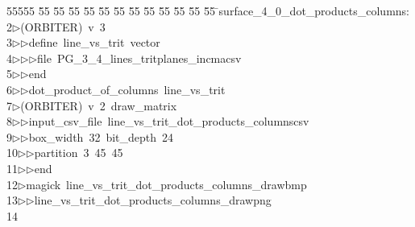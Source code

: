 %
%
\begin{tabbing}
55555 \= 55 \= 55 \= 55 \= 55 \= 55 \= 55 \= 55 \= 55 \= 55 \= 55 \= 55 \= 55 \= \>surface\_4\_0\_dot\_products\_columns:\\[0pt]
2\>$\triangleright$\>(ORBITER)\ v\ 3\ \\[0pt]
3\>$\triangleright$\>$\triangleright$\>define\ line\_vs\_trit\ vector\ \\[0pt]
4\>$\triangleright$\>$\triangleright$\>$\triangleright$\>file\ PG\_3\_4\_lines\_tritplanes\_incmacsv\ \\[0pt]
5\>$\triangleright$\>$\triangleright$\>end\ \\[0pt]
6\>$\triangleright$\>$\triangleright$\>dot\_product\_of\_columns\ line\_vs\_trit\\[0pt]
7\>$\triangleright$\>(ORBITER)\ v\ 2\ draw\_matrix\ \\[0pt]
8\>$\triangleright$\>$\triangleright$\>input\_csv\_file\ line\_vs\_trit\_dot\_products\_columnscsv\ \\[0pt]
9\>$\triangleright$\>$\triangleright$\>box\_width\ 32\ bit\_depth\ 24\ \\[0pt]
10\>$\triangleright$\>$\triangleright$\>partition\ 3\ 45\ 45\ \\[0pt]
11\>$\triangleright$\>$\triangleright$\>end\\[0pt]
12\>$\triangleright$\>magick\ line\_vs\_trit\_dot\_products\_columns\_drawbmp\ \\[0pt]
13\>$\triangleright$\>$\triangleright$\>line\_vs\_trit\_dot\_products\_columns\_drawpng\\[0pt]
14\>\end{tabbing}
